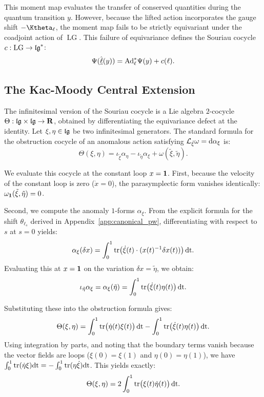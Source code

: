 \documentclass[11pt,reqno,letterpaper,twoside]{amsart}
\def\u(#1){\uline{#1}}
\newcommand{\LG}{\operatorname{LG}}
\begin{document}
  This moment map evaluates the transfer of conserved quantities during the quantum transition $y$.
  However,
  because the lifted action incorporates the gauge shift $-\Ktheta_\ell$,
  the moment map fails to be strictly equivariant under the coadjoint action of $\LG$.
  This failure of equivariance defines the Souriau cocycle $c: \LG \to \LieAlgebra{lg}^*$:
  \[
    \Psi(\hat{\u(\ell)}(y)) = \Ad_\ell^* \Psi(y) + c(\ell).
    \]
  
  \subsection{The Kac-Moody Central Extension}
  
  The infinitesimal version of the Souriau cocycle is a Lie algebra $2$-cocycle $\Theta: \LieAlgebra{lg} \times \LieAlgebra{lg} \to \RR$,
  obtained by differentiating the equivariance defect at the identity.
  Let $\xi, \eta \in \LieAlgebra{lg}$ be two infinitesimal generators.
  The standard formula for the obstruction cocycle of an anomalous action satisfying $\mathcal{L}_{\tilde{\xi}} \omega = \mathrm{d}\alpha_\xi$ is:
  \[
    \Theta(\xi, \eta) = \iota_{\tilde{\xi}} \alpha_\eta - \iota_{\tilde{\eta}} \alpha_\xi + \omega(\tilde{\xi}, \tilde{\eta}).
    \]
  
  We evaluate this cocycle at the constant loop $x = \boldsymbol{1}$.
  First,
  because the velocity of the constant loop is zero ($\dot{x} = 0$),
  the parasymplectic form vanishes identically: $\omega_{\boldsymbol{1}}(\tilde{\xi}, \tilde{\eta}) = 0$.
  
  Second,
  we compute the anomaly $1$-forms $\alpha_\xi$.
  From the explicit formula for the shift $\theta_{\ell_s}$ derived in Appendix~\ref{app:canonical_pw},
  differentiating with respect to $s$ at $s=0$ yields:
  \[
    \alpha_\xi(\delta x) = \int_0^1 \operatorname{tr}\bigl( \dot{\xi}(t) \cdot (x(t)^{-1} \delta x(t)) \bigr) \, \mathrm{dt}.
    \]
  Evaluating this at $x = \boldsymbol{1}$ on the variation $\delta x = \tilde{\eta}$,
  we obtain:
  \[
    \iota_{\tilde{\eta}} \alpha_\xi = \alpha_\xi(\tilde{\eta}) = \int_0^1 \operatorname{tr}\bigl( \dot{\xi}(t) \eta(t) \bigr) \, \mathrm{dt}.
    \]
  
  Substituting these into the obstruction formula gives:
  \[
    \Theta(\xi, \eta) = \int_0^1 \operatorname{tr}\bigl( \dot{\eta}(t) \xi(t) \bigr) \, \mathrm{dt} - \int_0^1 \operatorname{tr}\bigl( \dot{\xi}(t) \eta(t) \bigr) \, \mathrm{dt}.
    \]
  Using integration by parts,
  and noting that the boundary terms vanish because the vector fields are loops ($\xi(0)=\xi(1)$ and $\eta(0)=\eta(1)$),
  we have $\int_0^1 \operatorname{tr}(\dot{\eta} \xi) \mathrm{dt} = - \int_0^1 \operatorname{tr}(\eta \dot{\xi}) \mathrm{dt}$.
  This yields exactly:
  \[
    \Theta(\xi, \eta) = 2 \int_0^1 \operatorname{tr}\bigl( \xi(t) \dot{\eta}(t) \bigr) \, \mathrm{dt}.
    \]
  
\end{document}
